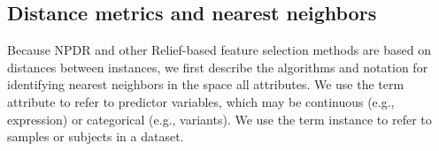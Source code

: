 \documentclass[10pt]{article}
\begin{document}
\def\ri{R_i}
\def\rj{R_j}
\def\kmi{k_{M_i}}
\def\khi{k_{H_i}}
\def\hji{H_{j_i}}
\def\ma{\overline{M}_a}
\def\ha{\overline{H}_a}
\def\mnu{M_\nu}
\def\hnu{H_\nu}
\def\myd{\text{diff}}
\def\ka{\bar{k}_\alpha}

\subsection{Distance metrics and nearest neighbors}\label{sec:reform}
Because NPDR and other Relief-based feature selection methods are based on distances between instances, we first describe the algorithms and notation for identifying nearest neighbors in the space all attributes. We use the term attribute to refer to predictor variables, which may be continuous (e.g., expression) or categorical (e.g., variants). We use the term instance to refer to samples or subjects in a dataset.  
\end{document}
